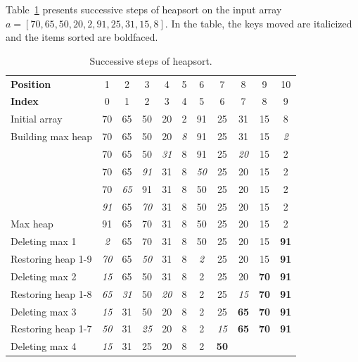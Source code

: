 \begin{Example}
Table~\ref{heapsort-example} presents 
successive steps of heapsort on
the input array \(a=[70, 65, 50, 20, 2, 91, 25, 31, 15, 8]\). 
In the table, the keys moved are italicized and the 
items sorted are boldfaced.

\begin{table}[htbp]
\caption{\label{heapsort-example} Successive steps of heapsort.}
\begin{tabular}{|l|c|c|c|c|c|c|c|c|c|c|} \hline
\textbf{Position}      & 1 & 2 & 3 & 4 & 5 & 6 & 7 & 8 & 9 & 10  \\ %
\textbf{Index}         & 0 & 1 & 2 & 3 & 4 & 5 & 6 & 7 & 8 & 9 \\ \hline
Initial array & 70 & 65 & 50 & 20 & 2 & 91 & 25 & 31 & 15 & 8 
\\ %
Building max heap & 70 & 65 & 50 & 20 & \textit{8} & 91 & 25 & 31 & 15 & \textit{2} 
\\ %
                  & 70 & 65 & 50 & \textit{31} & 8 & 91 & 25 & \textit{20} & 15 & 2  
\\ %
                  & 70 & 65 & \textit{91} & 31 & 8 & \textit{50} & 25 & 20 & 15 & 2  
\\ %
                  & 70 & \textit{65} & 91 & 31 & 8 & 50 & 25 & 20 & 15 & 2  
\\ %
                  & \textit{91} & 65 & \textit{70} & 31 & 8 & 50 & 25 & 20 & 15 & 2  
\\ \hline 
Max heap          & 91 & 65 & 70 & 31 & 8  & 50 & 25 & 20 & 15 & 2 
\\ \hline 
Deleting max 1& \emph{2} & 65 & 70 & 31 & 8 & 50 & 25 & 20 & 15 & \textbf{91} 
\\ %
Restoring heap 1-9& \emph{70} & 65 & \emph{50} & 31 & 8 & \emph{2} & 25 & 20 & 15 & \textbf{91} 
\\ \hline 
Deleting max 2& \emph{15} & 65 & 50 & 31 & 8 & 2 & 25 & 20 & \textbf{70} & \textbf{91} 
\\ %
Restoring heap 1-8& \emph{65} & \emph{31}  & 50 & \emph{20} & 8 & 2 & 25 & \emph{15} & \textbf{70} & \textbf{91} 
\\ \hline 
Deleting max 3& \emph{15} & 31 & 50 & 20 & 8 & 2 & 25 & \textbf{65} & \textbf{70} & \textbf{91} 
\\ %
Restoring heap 1-7& \emph{50} & 31  & \emph{25} & 20 & 8 & 2 & \emph{15} 
& \textbf{65} & \textbf{70} & \textbf{91} 
\\ \hline 
Deleting max 4& \emph{15} & 31 & 25 & 20 & 8 & 2 & \textbf{50} & 

\end{tabular}
\end{table}
\end{Example}
